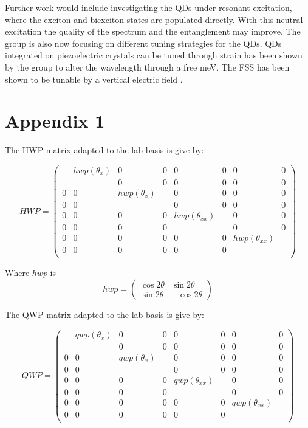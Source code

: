 \documentclass[12pt, twoside]{article}
\numberwithin{equation}{section}
\begin{document}
Further work would include investigating the QDs under resonant
excitation, where the exciton and biexciton states are populated
directly. With this neutral excitation the quality of the spectrum and
the entanglement may improve. The group is also now focusing on
different tuning strategies for the QDs. QDs integrated on piezoelectric
crystals can be tuned through strain has been shown by the group to
alter the wavelength through a free meV. The FSS has been shown to be
tunable by a vertical electric field \cite{verfield}.

\newpage
\section{Appendix 1}

The HWP matrix adapted to the lab basis is give by:

\[ HWP = \begin{pmatrix}
            & hwp(\theta_x)& 0& 0& 0& 0& 0& 0 \\
            & & 0& 0& 0& 0& 0& 0 \\
            0& 0& hwp(\theta_x)& & 0& 0& 0& 0 \\
            0& 0& & & 0& 0& 0& 0 \\
            0& 0& 0& 0&hwp(\theta_{xx}) & & 0& 0 \\
            0& 0& 0& 0& & & 0& 0 \\
            0& 0& 0& 0& 0& 0&hwp(\theta_{xx}) &  \\
            0& 0& 0& 0& 0& 0& & \\
            \end{pmatrix}\]

Where $hwp$ is
\[hwp = \begin{pmatrix} \cos{2 \theta} & \sin{2 \theta} \\ \sin{2 \theta} & -\cos{2 \theta} \end{pmatrix}\]

The QWP matrix adapted to the lab basis is give by:

\[ QWP = \begin{pmatrix}
            & qwp(\theta_x)& 0& 0& 0& 0& 0& 0 \\
            & & 0& 0& 0& 0& 0& 0 \\
            0& 0& qwp(\theta_x)& & 0& 0& 0& 0 \\
            0& 0& & & 0& 0& 0& 0 \\
            0& 0& 0& 0&qwp(\theta_{xx}) & & 0& 0 \\
            0& 0& 0& 0& & & 0& 0 \\
            0& 0& 0& 0& 0& 0&qwp(\theta_{xx}) &  \\
            0& 0& 0& 0& 0& 0& & \\
            \end{pmatrix}\]
\end{document}
